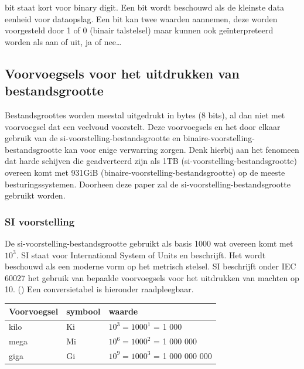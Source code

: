 \Gls{bit} staat kort voor binary digit. Een bit wordt beschouwd als de kleinste data eenheid voor dataopslag. Een bit kan twee waarden aannemen, deze worden voorgesteld door 1 of 0 (binair talstelsel) maar kunnen ook geïnterpreteerd worden als aan of uit, ja of nee…

\subsection{Voorvoegsels voor het uitdrukken van bestandsgrootte}
\label{sec:bestandsgrootte-dataopslag-voorvoegsels}

Bestandsgroottes worden meestal uitgedrukt in bytes (8 bits), al dan niet met voorvoegsel dat een veelvoud voorstelt. Deze voorvoegsels en het door elkaar gebruik van de \gls{si-voorstelling-bestandsgrootte} en \gls{binaire-voorstelling-bestandsgrootte} kan voor enige verwarring zorgen. Denk hierbij aan het fenomeen dat harde schijven die geadverteerd zijn als 1TB (\gls{si-voorstelling-bestandsgrootte}) overeen komt met 931GiB (\gls{binaire-voorstelling-bestandsgrootte}) op de meeste besturingssystemen. Doorheen deze paper zal de \gls{si-voorstelling-bestandsgrootte} gebruikt worden.

\subsubsection{SI voorstelling}
\label{sec:bestandsgrootte-dataopslag-voorvoegsels-si}

De \gls{si-voorstelling-bestandsgrootte} gebruikt als basis 1000 wat overeen komt met $ 10^{3} $. SI staat voor International System of Units en beschrijft. Het wordt beschouwd als een moderne vorm op het metrisch stelsel. SI beschrijft onder IEC 60027 het gebruik van bepaalde voorvoegsels voor het uitdrukken van machten op 10. (\cite{iec60027}) Een conversietabel is hieronder raadpleegbaar. 

\FloatBarrier
\begin{table}[h]
	\begin{tabular}{|l|l|l|}
		\hline
		\textbf{Voorvoegsel} & \textbf{symbool} & \textbf{waarde} \\ \hline
		kilo & Ki & $ 10^{3} = 1000^{1} $  = 1 000 \\ \hline
		mega & Mi & $ 10^{6} = 1000^{2} $  = 1 000 000 \\ \hline
		giga & Gi & $ 10^{9} = 1000^{3} $  = 1 000 000 000 \\ \hline
	\end{tabular}
\end{table}
\FloatBarrier

